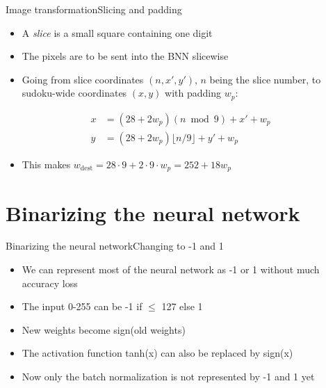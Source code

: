 \documentclass[10pt]{beamer}
\begin{document}
\begin{frame}{Image transformation}{Slicing and padding}
    \begin{itemize}
        \item A \emph{slice} is a small square containing one digit
        \item The pixels are to be sent into the BNN slicewise
    \pause
        \item Going from slice coordinates $(n, x', y')$, $n$ being the slice number, to sudoku-wide coordinates $(x,y)$ with padding $w_p$:
    \end{itemize}
    \begin{align*}
        x &= (28+2w_p)(n\bmod 9) + x' + w_p \\
        y &= (28+2w_p)\lfloor n/9\rfloor + y' + w_p
    \end{align*}
    \pause
    \begin{itemize}
        \item This makes $w_\text{dest} = 28\cdot 9 + 2\cdot 9\cdot w_p = 252+18w_p$
    \end{itemize}
\end{frame}
\section{Binarizing the neural network}
\begin{frame}{Binarizing the neural network}{Changing to -1 and 1}
\begin{itemize}
	\item We can represent most of the neural network as -1 or 1 without much accuracy loss
	\item The input 0-255 can be -1 if $\leq$ 127 else 1
	\item New weights become sign(old weights)
	\item The activation function tanh(x) can also be replaced by sign(x)
	\item Now only the batch normalization is not represented by -1 and 1 yet
\end{itemize}
\end{frame}
\end{document}
